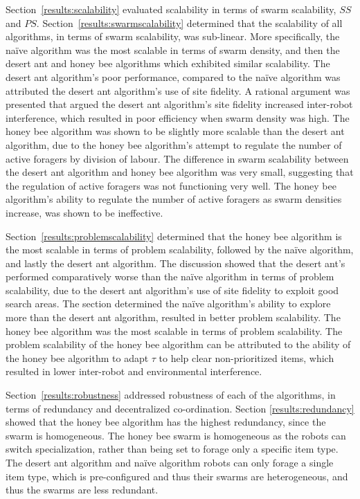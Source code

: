 Section~\ref{results:scalability} evaluated scalability in terms of swarm scalability, $SS$ and $PS$. Section~\ref{results:swarmscalability} determined that the scalability of all algorithms, in terms of swarm scalability, was sub-linear. More specifically, the na\"ive algorithm was the most scalable in terms of swarm density, and then the desert ant and honey bee algorithms which exhibited similar scalability. The desert ant algorithm's poor performance, compared to the na\"ive algorithm was attributed the desert ant algorithm's use of site fidelity. A rational argument was presented that argued the desert ant algorithm's site fidelity increased inter-robot interference, which resulted in poor efficiency when swarm density was high. The honey bee algorithm was shown to be slightly more scalable than the desert ant algorithm, due to the honey bee algorithm's attempt to regulate the number of active foragers by division of labour. The difference in swarm scalability between the desert ant algorithm and honey bee algorithm was very small, suggesting that the regulation of active foragers was not functioning very well. The honey bee algorithm's ability to regulate the number of active foragers as swarm densities increase, was shown to be ineffective. 

Section~\ref{results:problemscalability} determined that the honey bee algorithm is the most scalable in terms of problem scalability, followed by the na\"ive algorithm, and lastly the desert ant algorithm. The discussion showed that the desert ant's performed comparatively worse than the na\"ive algorithm in terms of problem scalability, due to the desert ant algorithm's use of site fidelity to exploit good search areas. The section determined the na\"ive algorithm's ability to explore more than the desert ant algorithm, resulted in better problem scalability. The honey bee algorithm was the most scalable in terms of problem scalability. The problem scalability of the honey bee algorithm can be attributed to the ability of the honey bee algorithm to adapt $\tau$ to help clear non-prioritized items, which resulted in lower inter-robot and environmental interference.

Section~\ref{results:robustness} addressed robustness of each of the algorithms, in terms of redundancy and decentralized co-ordination. Section \ref{results:redundancy} showed that the honey bee algorithm has the highest redundancy, since the swarm is homogeneous. The honey bee swarm is homogeneous as the robots can switch specialization, rather than being set to forage only a specific item type. The desert ant algorithm and na\"ive algorithm robots can only forage a single item type, which is pre-configured and thus their swarms are heterogeneous, and thus the swarms are less redundant.

